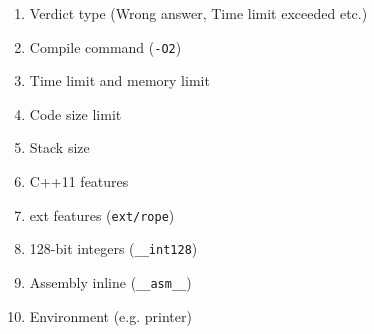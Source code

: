 \begin{enumerate}
\item Verdict type (Wrong answer, Time limit exceeded etc.)
\item Compile command (\texttt{-O2})
\item Time limit and memory limit
\item Code size limit
\item Stack size
\item C++11 features
\item ext features (\texttt{ext/rope})
\item 128-bit integers (\texttt{\_\_int128})
\item Assembly inline (\texttt{\_\_asm\_\_})
\item Environment (e.g. printer)
\end{enumerate}


